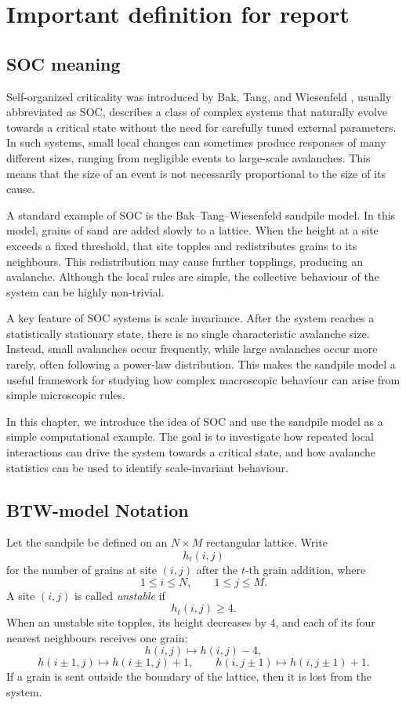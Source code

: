 \chapter{Important definition for report}\label{ch:introduction1}

\section{SOC meaning}\label{sec:socdef}

Self-organized criticality was introduced by Bak, Tang, and Wiesenfeld \cite{bak1987soc,bak1988soc}, usually abbreviated as SOC, describes a class of complex systems that naturally evolve towards a critical state without the need for carefully tuned external parameters. In such systems, small local changes can sometimes produce responses of many different sizes, ranging from negligible events to large-scale avalanches. This means that the size of an event is not necessarily proportional to the size of its cause.

A standard example of SOC is the Bak--Tang--Wiesenfeld sandpile model. In this model, grains of sand are added slowly to a lattice. When the height at a site exceeds a fixed threshold, that site topples and redistributes grains to its neighbours. This redistribution may cause further topplings, producing an avalanche. Although the local rules are simple, the collective behaviour of the system can be highly non-trivial.

A key feature of SOC systems is scale invariance. After the system reaches a statistically stationary state, there is no single characteristic avalanche size. Instead, small avalanches occur frequently, while large avalanches occur more rarely, often following a power-law distribution. This makes the sandpile model a useful framework for studying how complex macroscopic behaviour can arise from simple microscopic rules.

In this chapter, we introduce the idea of SOC and use the sandpile model as a simple computational example. The goal is to investigate how repeated local interactions can drive the system towards a critical state, and how avalanche statistics can be used to identify scale-invariant behaviour.

\section{BTW-model Notation}\label{sec:btwmodeldef}

Let the sandpile be defined on an $N\times M$ rectangular lattice. Write
\[
    h_t(i,j)
\]
for the number of grains at site $(i,j)$ after the $t$-th grain addition, where
\[
    1\leq i\leq N,\qquad 1\leq j\leq M.
\]
A site $(i,j)$ is called \emph{unstable} if
\[
    h_t(i,j)\geq 4.
\]
When an unstable site topples, its height decreases by $4$, and each of its four nearest neighbours receives one grain:
\[
    h(i,j)\mapsto h(i,j)-4,
\]
\[
    h(i\pm 1,j)\mapsto h(i\pm 1,j)+1,
    \qquad
    h(i,j\pm 1)\mapsto h(i,j\pm 1)+1.
\]
If a grain is sent outside the boundary of the lattice, then it is lost from the system.

